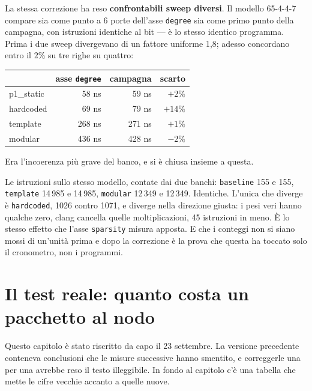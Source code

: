 \documentclass[11pt,a4paper,oneside]{report}
\begin{document}
\begin{prima}
La stessa correzione ha reso \textbf{confrontabili sweep diversi}. Il modello
65-4-4-7 compare sia come punto a 6 porte dell'asse \texttt{degree} sia come
primo punto della campagna, con istruzioni identiche al bit --- è lo stesso
identico programma. Prima i due sweep divergevano di un fattore uniforme 1,8;
adesso concordano entro il $2\%$ su tre righe su quattro:

\begin{center}
\small
\begin{tabular}{@{}lrrr@{}}
\toprule
& \textbf{asse \texttt{degree}} & \textbf{campagna} & \textbf{scarto} \\
\midrule
p1\_static &  58 ns &  59 ns & $+2\%$ \\
hardcoded  &  69 ns &  79 ns & $+14\%$ \\
template   & 268 ns & 271 ns & $+1\%$ \\
modular    & 436 ns & 428 ns & $-2\%$ \\
\bottomrule
\end{tabular}
\end{center}

Era l'incoerenza più grave del banco, e si è chiusa insieme a questa.
\end{prima}

\begin{prima}
Le istruzioni sullo stesso modello, contate dai due banchi: \texttt{baseline}
155 e 155, \texttt{template} 14\,985 e 14\,985, \texttt{modular} 12\,349 e
12\,349. Identiche. L'unica che diverge è \texttt{hardcoded}, 1026 contro 1071,
e diverge nella direzione giusta: i pesi veri hanno qualche zero, clang
cancella quelle moltiplicazioni, 45 istruzioni in meno. È lo stesso effetto
che l'asse \texttt{sparsity} misura apposta. E che i conteggi non si siano
mossi di un'unità prima e dopo la correzione è la prova che questa ha toccato
solo il cronometro, non i programmi.
\end{prima}


\chapter{Il test reale: quanto costa un pacchetto al nodo}
\label{ch:reale}

Questo capitolo è stato riscritto da capo il 23 settembre. La versione
precedente conteneva conclusioni che le misure successive hanno smentito, e
correggerle una per una avrebbe reso il testo illeggibile. In fondo al capitolo
c'è una tabella che mette le cifre vecchie accanto a quelle nuove.
\end{document}
